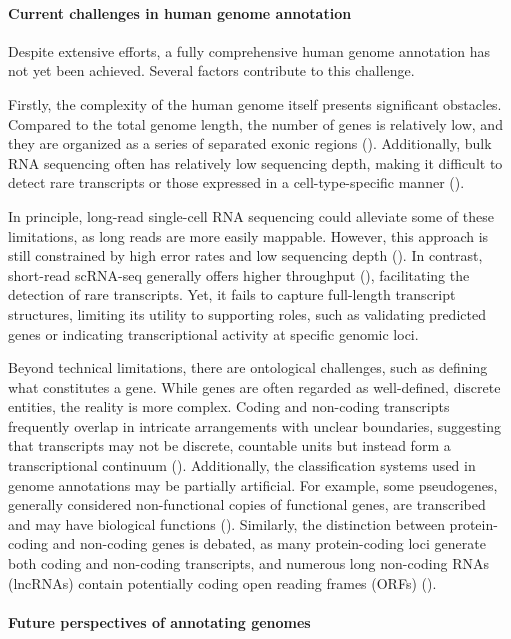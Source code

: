 \paragraph{Current challenges in human genome annotation}

Despite extensive efforts, a fully comprehensive human genome annotation has not yet been achieved.
Several factors contribute to this challenge.

Firstly, the complexity of the human genome itself presents significant obstacles.
Compared to the total genome length, the number of genes is relatively low,
and they are organized as a series of separated exonic regions (\cite{Salzberg2019}).
Additionally, bulk RNA sequencing often has relatively low sequencing depth,
making it difficult to detect rare transcripts or those expressed in a cell-type-specific manner (\cite{Guigo2023}).

In principle, long-read single-cell RNA sequencing could alleviate some of these limitations, as long reads are more easily mappable.
However, this approach is still constrained by high error rates and low sequencing depth (\cite{Guigo2023}).
In contrast, short-read scRNA-seq generally offers higher throughput (\cite{Heumos2023}), facilitating the detection of rare transcripts.
Yet, it fails to capture full-length transcript structures, limiting its utility to supporting roles,
such as validating predicted genes or indicating transcriptional activity at specific genomic loci.

Beyond technical limitations, there are ontological challenges, such as defining what constitutes a gene.
While genes are often regarded as well-defined, discrete entities, the reality is more complex.
Coding and non-coding transcripts frequently overlap in intricate arrangements with unclear boundaries,
suggesting that transcripts may not be discrete, countable units but instead form a transcriptional continuum (\cite{Salzberg2019}).
Additionally, the classification systems used in genome annotations may be partially artificial.
For example, some pseudogenes, generally considered non-functional copies of functional genes,
are transcribed and may have biological functions (\cite{Pei2012}).
Similarly, the distinction between protein-coding and non-coding genes is debated, as many protein-coding loci generate both coding
and non-coding transcripts, and numerous long non-coding RNAs (lncRNAs) contain potentially coding open reading frames (ORFs) (\cite{Salzberg2019}).

\paragraph{Future perspectives of annotating genomes}

